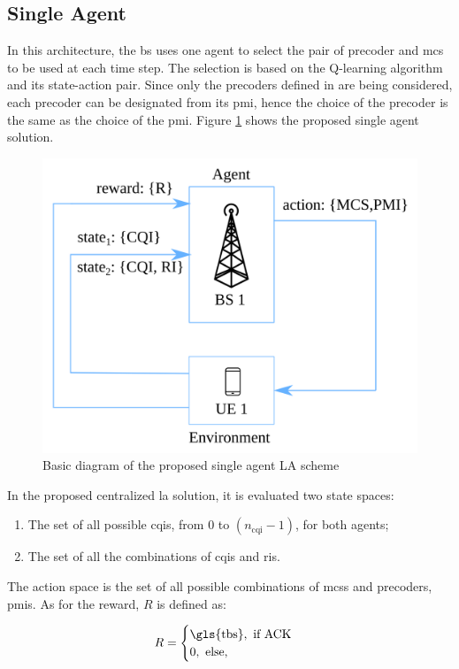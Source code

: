 \subsection{Single Agent}
\label{subsec:single-agent}

In this architecture, the \gls{bs} uses one agent to select the pair of precoder and \gls{mcs} to be used at each time step.
%
The selection is based on the Q-learning algorithm and its state-action pair.
%
Since only the precoders defined in \cite{3gpp.38.214} are being considered, each precoder can be designated from its \gls{pmi}, hence the choice of the precoder is the same as the choice of the \gls{pmi}.
%
Figure \ref{fig:la-rl-frame-sa} shows the proposed single agent solution.


\begin{figure}[!hb]
	\centerline{\includegraphics[width=0.7\columnwidth]{figures/chp_la/rl-framework-mateus_sa.png}}
	\caption{Basic diagram of the proposed single agent LA scheme}
	\label{fig:la-rl-frame-sa}
\end{figure}

In the proposed centralized \gls{la} solution, it is evaluated two state spaces:
\begin{enumerate}
    \item The set of all possible \gls{cqi}s, from $0$ to $(n_{\text{cqi}}-1)$, for both agents;
    \item The set of all the combinations of \glspl{cqi} and \glspl{ri}.
\end{enumerate}
%
The action space is the set of all possible combinations of \glspl{mcs} and precoders, \glspl{pmi}.
%
As for the reward, $R$ is defined as:

\begin{equation}\label{eq.:la-reward-sa}
    R = \begin{cases}
    \textrm{\gls{tbs}}, \text{ if ACK} \\
    0, \text{ else,}
    \end{cases}
\end{equation}

